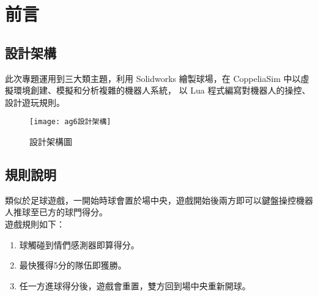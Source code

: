 \chapter{前言}
\renewcommand{\baselinestretch}{10.0} %
\setcounter{page}{1}  %
\fontsize{14pt}{2.5pt}\sectionef
\section{設計架構}
此次專題運用到三大類主題，利用 Solidworks 繪製球場，在 CoppeliaSim 中以虛擬環境創建、模擬和分析複雜的機器人系統， 以 Lua 程式編寫對機器人的操控、設計遊玩規則。\\

\begin{figure}[hbt!]
\begin{center}
\texttt{[image: ag6設計架構]}
\caption{\Large 設計架構圖}\label{fig.ag6設計架構}
\end{center}
\end{figure}

\section{規則說明}
類似於足球遊戲，一開始時球會置於場中央，遊戲開始後兩方即可以鍵盤操控機器人推球至已方的球門得分。\\
遊戲規則如下：
\begin{enumerate}
\item 球觸碰到情們感測器即算得分。
\item 最快獲得5分的隊伍即獲勝。
\item 任一方進球得分後，遊戲會重置，雙方回到場中央重新開球。
\end{enumerate}

\renewcommand{\baselinestretch}{0.5} %